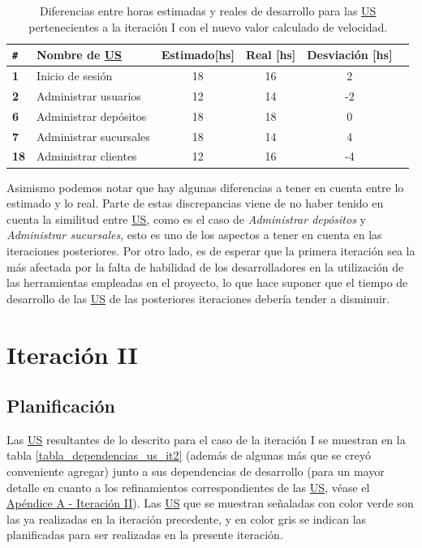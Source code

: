 \documentclass[a4paper, 12pt,twoside]{report}  %
\numberwithin{equation}{subsection} %
\begin{document}
\begin{table}[h!]
	\centering
	\captionsetup{justification=centering,margin=1.5cm}
	\begin{tabular}{ |p{0.5cm}|l|c|c|c|c| }
		\hline
		\verb|#|& \textbf{Nombre de \hyperlink{US}{US}}& \textbf{Estimado[hs]} & \textbf{Real [hs]} & \textbf{Desviación [hs]} \\
		\hline
		\textbf{1} & Inicio de sesión & 18 & 16 & \cellcolor{diferencia_estimacion_positiva}2 \\
		\hline
		\textbf{2} & Administrar usuarios & 12 & 14 & \cellcolor{diferencia_estimacion_negativa}-2 \\
		\hline
		\textbf{6} & Administrar depósitos & 18 & 18 & \cellcolor{diferencia_estimacion_positiva}0 \\
		\hline
		\textbf{7} & Administrar sucursales & 18 & 14 & \cellcolor{diferencia_estimacion_positiva}4 \\
		\hline
		\textbf{18} & Administrar clientes & 12 & 16 & \cellcolor{diferencia_estimacion_negativa}-4 \\
		\hline
	\end{tabular}
	\caption{Diferencias entre horas estimadas y reales de desarrollo para las \protect\hyperlink{US}{US} pertenecientes a la iteración I con el nuevo valor calculado de velocidad.}
	\label{tabla_dif_horas_estim_iter_1}
\end{table}

\indent Asimismo podemos notar que hay algunas diferencias a tener en cuenta entre lo estimado y lo real. Parte de estas discrepancias viene de no haber tenido en cuenta la similitud entre \hyperlink{US}{US}, como es el caso de \textit{Administrar depósitos} y \textit{Administrar sucursales}, esto es uno de los aspectos a tener en cuenta en las iteraciones posteriores. Por otro lado, es de esperar que la primera iteración sea la más afectada por la falta de habilidad de los desarrolladores en la utilización de las herramientas empleadas en el proyecto, lo que hace suponer que el tiempo de desarrollo de las \hyperlink{US}{US} de las posteriores iteraciones debería tender a disminuir.

\section{Iteración II}
\label{descripcion_iteracion_II}
\subsection{Planificación}
Las \hyperlink{US}{US} resultantes de lo descrito para el caso de la iteración I se muestran en la tabla \ref{tabla_dependencias_us_it2} (además de algunas más que se creyó conveniente agregar) junto a sus dependencias de desarrollo (para un mayor detalle en cuanto a los refinamientos correspondientes de las \hyperlink{US}{US}, véase el \hyperlink{apendice_a_II}{Apéndice A - Iteración II}). Las \hyperlink{US}{US} que se muestran señaladas con color verde son las ya realizadas en la iteración precedente, y en color gris se indican las planificadas para ser realizadas en la presente iteración.
\end{document}
